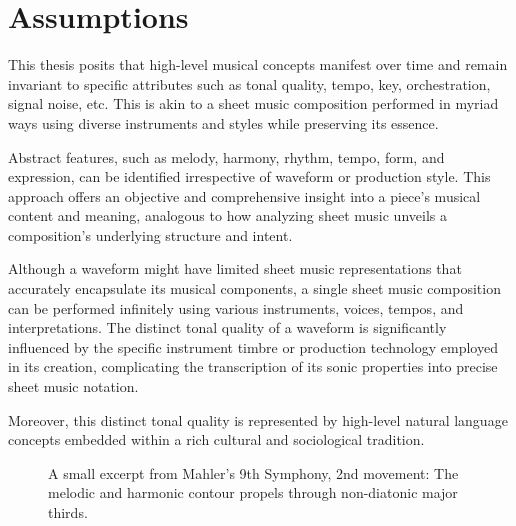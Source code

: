 \section{Assumptions}

This thesis posits that high-level musical concepts manifest over time and remain invariant to specific attributes such as tonal quality, tempo, key, orchestration, signal noise, etc. This is akin to a sheet music composition performed in myriad ways using diverse instruments and styles while preserving its essence.

Abstract features, such as melody, harmony, rhythm, tempo, form, and expression, can be identified irrespective of waveform or production style. This approach offers an objective and comprehensive insight into a piece's musical content and meaning, analogous to how analyzing sheet music unveils a composition's underlying structure and intent.

Although a waveform might have limited sheet music representations that accurately encapsulate its musical components, a single sheet music composition can be performed infinitely using various instruments, voices, tempos, and interpretations. The distinct tonal quality of a waveform is significantly influenced by the specific instrument timbre or production technology employed in its creation, complicating the transcription of its sonic properties into precise sheet music notation.

Moreover, this distinct tonal quality is represented by high-level natural language concepts embedded within a rich cultural and sociological tradition.


\begin{figure}
    \centering
    \caption[Mahler's 9th Symphony, 2nd movement]{\small{A small excerpt from Mahler's 9th Symphony, 2nd movement: The melodic and harmonic contour propels through non-diatonic major thirds.}}
    \label{fig:mahler}
\end{figure}

